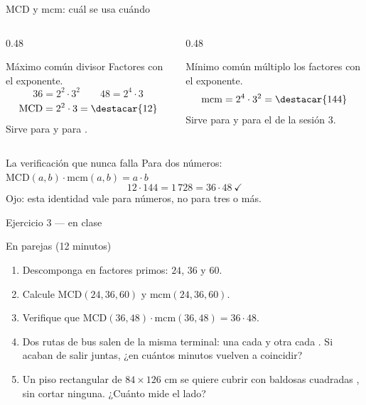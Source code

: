 \documentclass[aspectratio=169,10pt]{beamer}
\begin{document}
\begin{frame}{MCD y mcm: cuál se usa cuándo}
  \scriptsize
  \begin{columns}[T,onlytextwidth]
    \begin{column}{0.48\textwidth}
      \begin{block}{Máximo común divisor}
        \tiny
        Factores  con el  exponente.
        \[ 36 = 2^2\cdot 3^2 \qquad 48 = 2^4\cdot 3 \]
        \[ \mathrm{MCD} = 2^2\cdot 3 = \destacar{12} \]
        Sirve para  y para
        .
      \end{block}
    \end{column}
    \begin{column}{0.48\textwidth}
      \begin{block}{Mínimo común múltiplo}
        \tiny
         los factores con el  exponente.
        \[ \mathrm{mcm} = 2^4\cdot 3^2 = \destacar{144} \]
        Sirve para  y para el
         de la sesión 3.
      \end{block}
    \end{column}
  \end{columns}

  \vspace{0.1cm}
  \begin{alertblock}{La verificación que nunca falla}
    \scriptsize
    Para dos números: \quad
    $\mathrm{MCD}(a,b)\cdot \mathrm{mcm}(a,b) = a\cdot b$
    \[ 12 \cdot 144 = 1\,728 = 36\cdot 48 \ \checkmark \]
    {\tiny\color{uniGris} Ojo: esta identidad vale para  números, no
    para tres o más.}
  \end{alertblock}
\end{frame}

\begin{frame}{Ejercicio 3 — en clase}
  \begin{alertblock}{En parejas (12 minutos)}
    \scriptsize
    \begin{enumerate}\setlength{\itemsep}{0.08cm}
      \item Descomponga en factores primos: $24$, $36$ y $60$.
      \item Calcule $\mathrm{MCD}(24,36,60)$ y $\mathrm{mcm}(24,36,60)$.
      \item Verifique que $\mathrm{MCD}(36,48)\cdot\mathrm{mcm}(36,48)
            = 36\cdot 48$.
      \item Dos rutas de bus salen de la misma terminal: una cada
             y otra cada . Si acaban
            de salir juntas, ¿en cuántos minutos vuelven a coincidir?
      \item Un piso rectangular de $84 \times 126$ cm se quiere cubrir con
            baldosas cuadradas , sin cortar
            ninguna. ¿Cuánto mide el lado?
    \end{enumerate}
  \end{alertblock}
\end{frame}
\end{document}

